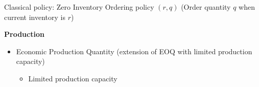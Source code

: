 Classical policy: Zero Inventory Ordering policy $(r,q)$ (Order quantity $q$ when current inventory is $r$)

\medskip

\textbf{Production}

\begin{itemize}
  \item Economic Production Quantity (extension of EOQ with limited production capacity) \cite{Taft1918}
  \begin{itemize}
    \item Limited production capacity
  \end{itemize}
\end{itemize}


\medskip


\medskip






